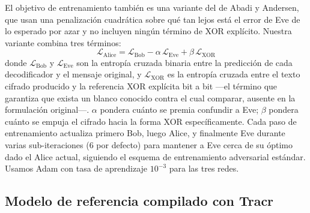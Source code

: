 \documentclass[manuscript,screen]{acmart}
\begin{document}
El objetivo de entrenamiento también es una variante del de Abadi y Andersen, que usan una
penalización cuadrática sobre qué tan lejos está el error de Eve de lo esperado por azar y no
incluyen ningún término de XOR explícito. Nuestra variante combina tres términos:
\begin{equation}
  \mathcal{L}_{\text{Alice}} = \mathcal{L}_{\text{Bob}} - \alpha\,\mathcal{L}_{\text{Eve}} + \beta\,\mathcal{L}_{\text{XOR}}
\end{equation}
donde $\mathcal{L}_{\text{Bob}}$ y $\mathcal{L}_{\text{Eve}}$ son la entropía cruzada binaria
entre la predicción de cada decodificador y el mensaje original, y $\mathcal{L}_{\text{XOR}}$
es la entropía cruzada entre el texto cifrado producido y la referencia XOR explícita
bit a bit —el término que garantiza que exista un blanco conocido contra el cual comparar,
ausente en la formulación original—. $\alpha$ pondera cuánto se premia confundir a Eve; $\beta$
pondera cuánto se empuja el cifrado hacia la forma XOR específicamente. Cada paso de
entrenamiento actualiza primero Bob, luego Alice, y finalmente Eve durante varias
sub-iteraciones (6 por defecto) para mantener
a Eve cerca de su óptimo dado el Alice actual, siguiendo el esquema de entrenamiento adversarial
estándar. Usamos Adam \citep{kingma2015adam} con tasa de aprendizaje $10^{-3}$ para las tres
redes.

\subsection{Modelo de referencia compilado con Tracr}
\end{document}
